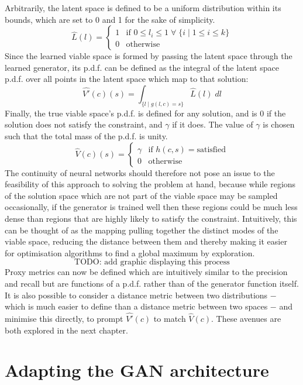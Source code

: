 \documentclass[../../main.tex]{subfiles}
\begin{document}
Arbitrarily, the latent space is defined to be a uniform distribution within its bounds, which are set to 0 and 1 for the sake of simplicity.
$$\hat{L}(l) =
\left\{
	\begin{array}{ll}
		1 & \mbox{if } 0 \le l_i \le 1 \; \forall \; \{i \; | \; 1 \le i \le k\} \\
		0 & \mbox{otherwise}
	\end{array}
\right.$$
Since the learned viable space is formed by passing the latent space through the learned generator, its p.d.f. can be defined as the integral of the latent space p.d.f. over all points in the latent space which map to that solution:
$$\hat{V'}(c)(s) = \int_{\{l \; | \; g(l,c) = s\}} \hat{L}(l) \; dl$$
Finally, the true viable space's p.d.f. is defined for any solution, and is $0$ if the solution does not satisfy the constraint, and $\gamma$ if it does.
The value of $\gamma$ is chosen such that the total mass of the p.d.f. is unity.
$$\hat{V}(c)(s) =
\left\{
	\begin{array}{ll}
		\gamma & \mbox{if } h(c,s) = \text{satisfied} \\
		0 & \mbox{otherwise}
	\end{array}
\right.$$
The continuity of neural networks should therefore not pose an issue to the feasibility of this approach to solving the problem at hand, because while regions of the solution space which are not part of the viable space may be sampled occasionally, if the generator is trained well then these regions could be much less dense than regions that are highly likely to satisfy the constraint.
Intuitively, this can be thought of as the mapping pulling together the distinct modes of the viable space, reducing the distance between them and thereby making it easier for optimisation algorithms to find a global maximum by exploration.
$$\text{TODO: add graphic displaying this process}$$
Proxy metrics can now be defined which are intuitively similar to the precision and recall but are functions of a p.d.f. rather than of the generator function itself.
It is also possible to consider a distance metric between two distributions $-$ which is much easier to define than a distance metric between two spaces $-$ and minimise this directly, to prompt $\hat{V'}(c)$ to match $\hat{V}(c)$.
These avenues are both explored in the next chapter.

\section{Adapting the GAN architecture}
\end{document}
